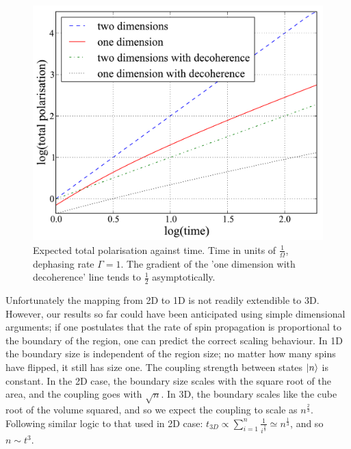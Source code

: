 \begin{figure}
  \begin{center}
\includegraphics[scale=0.5]{assets/comparison.pdf}
\end{center}
\caption{Expected total polarisation against time. Time in units of
  $\frac{1}{\Omega}$, dephasing rate $\Gamma = 1$. The gradient of the
    'one dimension with decoherence' line tends to $\frac{1}{2}$ asymptotically.}
    \label{comparison}
    \end{figure}




    Unfortunately the mapping from 2D to 1D is not readily extendible to 3D. However, our results so far could have been anticipated using simple dimensional arguments; if one postulates that the rate of spin propagation is proportional to the boundary of the region, one can predict the correct scaling behaviour. In 1D the boundary size is independent of the region size; no matter how many spins have flipped, it still has size one. The coupling strength between states $\left\vert n\right\rangle$ is constant. In the 2D case, the boundary size scales with the square root of the area, and the coupling goes with $\sqrt{n}$. In 3D, the boundary scales like the cube root of the volume squared, and so we expect the coupling to scale as $n^{\frac{2}{3}}$. Following similar logic to that used in 2D case: $t_{3D}\propto \sum_{i=1}^{n}\frac{1}{i^\frac{2}{3}}\simeq n^{\frac{1}{3}}$, and so $n \sim t^3$.  


